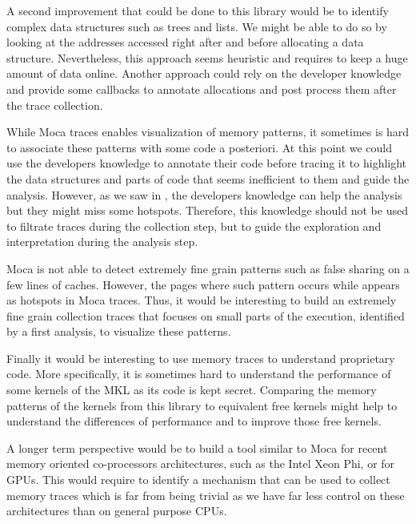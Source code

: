 A second improvement that could be done to this library would be to identify complex data structures such as trees and lists.
We might be able to do so by looking at the addresses accessed right after and before allocating a data structure.
Nevertheless, this approach seems heuristic and requires to keep a huge amount of data online.
Another approach could rely on the developer knowledge and provide some callbacks to annotate allocations and post process them after the trace collection.

While \gls{Moca} traces enables visualization of memory patterns, it sometimes is hard to associate these patterns with some code a posteriori.
At this point we could use the developers knowledge to annotate their code before tracing it to highlight the data structures and parts of code that seems inefficient to them and guide the analysis.
However, as we saw in , the developers knowledge can help the analysis but they might miss some hotspots.
Therefore, this knowledge should not be used to filtrate traces during the collection step, but to guide the exploration and interpretation during the analysis step.

\gls{Moca} is not able to detect extremely fine grain patterns such as false sharing on a few lines of caches.
However, the pages where such pattern occurs while appears as hotspots in \gls{Moca} traces.
Thus, it would be interesting to build an extremely fine grain collection traces that focuses on small parts of the execution, identified by a first analysis, to visualize these patterns.

Finally it would be interesting to use memory traces to understand proprietary code.
More specifically, it is sometimes hard to understand the performance of some kernels of the \gls{MKL} as its code is kept secret.
Comparing the memory patterns of the kernels from this library to equivalent free kernels might help to understand the differences of performance and to improve those free kernels.

A longer term perspective would be to build a tool similar to \gls{Moca} for recent memory oriented co-processors architectures, such as the \gls{Intel} Xeon Phi, or for \glspl{GPU}.
This would require to identify a mechanism that can be used to collect memory traces which is far from being trivial as we have far less control on these architectures than on general purpose \glspl{CPU}.

